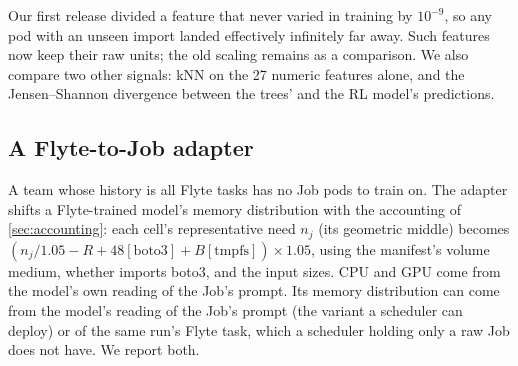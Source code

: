 Our first release divided a feature that never varied in training by $10^{-9}$, so any pod with an unseen import
landed effectively infinitely far away. Such features now keep their raw units; the old scaling remains as a
comparison. We also compare two other signals: kNN on the 27 numeric features alone, and the Jensen--Shannon
divergence between the trees' and the RL model's predictions.

\subsection{A Flyte-to-Job adapter}
A team whose history is all Flyte tasks has no Job pods to train on. The adapter shifts a Flyte-trained model's
memory distribution with the accounting of \cref{sec:accounting}: each cell's representative need $n_j$ (its
geometric middle) becomes $(n_j/1.05 - R + 48[\text{boto3}] + B[\text{tmpfs}])\times1.05$, using the manifest's
volume medium, whether  imports boto3, and the input sizes. CPU and GPU come from the model's own
reading of the Job's prompt. Its memory distribution can come from the model's reading of the Job's prompt (the
variant a scheduler can deploy) or of the same run's Flyte task, which a scheduler holding only a raw Job does not
have. We report both.
